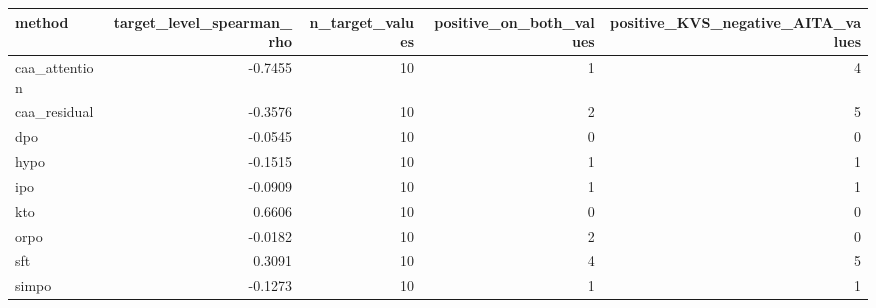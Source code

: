 \begin{tabular}{lrrrr}
\toprule
method & target\_level\_spearman\_rho & n\_target\_values & positive\_on\_both\_values & positive\_KVS\_negative\_AITA\_values \\
\midrule
caa\_attention & -0.7455 & 10 & 1 & 4 \\
caa\_residual & -0.3576 & 10 & 2 & 5 \\
dpo & -0.0545 & 10 & 0 & 0 \\
hypo & -0.1515 & 10 & 1 & 1 \\
ipo & -0.0909 & 10 & 1 & 1 \\
kto & 0.6606 & 10 & 0 & 0 \\
orpo & -0.0182 & 10 & 2 & 0 \\
sft & 0.3091 & 10 & 4 & 5 \\
simpo & -0.1273 & 10 & 1 & 1 \\
\bottomrule
\end{tabular}
